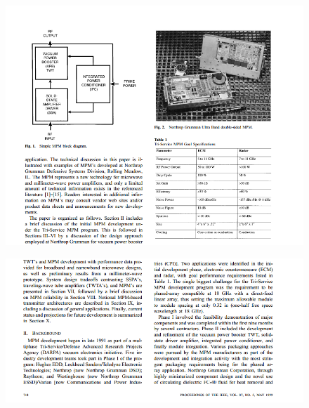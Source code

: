\begin{figure}[tbph]
\centering
\includegraphics[width=0.7\linewidth]{../pics/Capture3}
\end{figure}

\begin{figure}[tbph]
\centering
\includegraphics[width=0.7\linewidth]{../pics/Capture4}
\end{figure}

